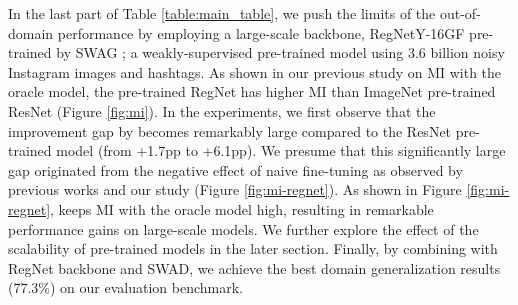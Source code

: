 In the last part of Table \ref{table:main_table}, we push the limits of the out-of-domain performance by employing a large-scale backbone, RegNetY-16GF pre-trained by SWAG \cite{singh2022swag}; a weakly-supervised pre-trained model using 3.6 billion noisy Instagram images and hashtags. As shown in our previous study on MI with the oracle model, the pre-trained RegNet has higher MI than ImageNet pre-trained ResNet (Figure \ref{fig:mi}). In the experiments, we first observe that the improvement gap by \method{} becomes remarkably large compared to the ResNet pre-trained model (from +1.7pp to +6.1pp). We presume that this significantly large gap originated from the negative effect of naive fine-tuning as observed by previous works \cite{wortsman2021robust, kumar2022iclr_finetuning_distort} and our study (Figure \ref{fig:mi-regnet}). As shown in Figure \ref{fig:mi-regnet}, \method{} keeps MI with the oracle model high, resulting in remarkable performance gains on large-scale models. We further explore the effect of the scalability of pre-trained models in the later section.
Finally, by combining \method{} with RegNet backbone and SWAD, we achieve the best domain generalization results (77.3\%) on our evaluation benchmark.



